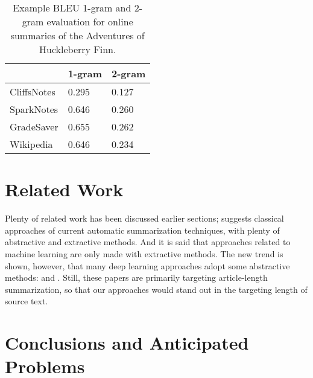 \begin{table}[hbt]
	\centering
	\caption{Example BLEU 1-gram and 2-gram evaluation for online summaries of the Adventures of Huckleberry Finn.}\label{table:bleu_huckfinn}
	\begin{tabular}{l l l }
		\toprule
		\textbf{}   & \textbf{1-gram} & \textbf{2-gram} \\ \midrule
		CliffsNotes & 0.295           & 0.127           \\ \midrule
		SparkNotes  & 0.646           & 0.260           \\ \midrule
		GradeSaver  & 0.655           & 0.262           \\ \midrule
		Wikipedia   & 0.646           & 0.234           \\
		\bottomrule
	\end{tabular}
\end{table}

\section{Related Work}
Plenty of related work has been discussed earlier sections; \cite{Gaikwad2016} 
suggests classical approaches of current automatic summarization techniques, 
with plenty of abstractive and extractive methods. And it is said that 
approaches related to machine learning are only made with extractive methods. 
The new trend is shown, however, that many deep learning approaches adopt some 
abstractive methods: \cite{2016arXiv160206023N} and \cite{Rush2015}. Still, 
these papers are primarily targeting article-length summarization, so that our 
approaches would stand out in the targeting length of source text.

\section{Conclusions and Anticipated Problems}

